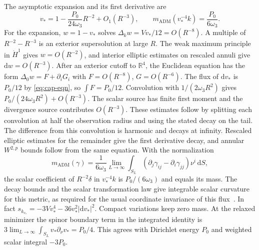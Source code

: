 \documentclass[11pt]{article}
\numberwithin{equation}{section}
\newcommand{\dd}{\mathrm{d}}
\newcommand{\RR}{\mathbb{R}}
\newcommand{\abs}[1]{\lvert #1\rvert}
\begin{document}
The asymptotic expansion and its first derivative are
\begin{equation}\label{eq:cap-mass}
 v_*=1-\frac{P_0}{24\omega_3}R^{-2}+O_1(R^{-3}),\qquad
 m_{\mathrm{ADM}}(v_*^{-4}k)=\frac{P_0}{6\omega_3}.
\end{equation}
For the expansion, \(w=1-v_*\) solves
\(\Delta_k w=Vv_*/12=O(R^{-8})\). A multiple of \(R^{-2}-R^{-3}\)
is an exterior supersolution at large \(R\). The weak maximum
principle in \(\dot H^1\) gives \(w=O(R^{-2})\), and interior
elliptic estimates on rescaled annuli give \(\dd w=O(R^{-3})\).
After an exterior cutoff to \(\RR^4\), the Euclidean equation has
the form \(\Delta_0 w=F+\partial_i G_i\) with
\(F=O(R^{-8})\), \(G=O(R^{-6})\). The flux of
\(\dd v_*\) is \(P_0/12\) by \eqref{eq:cap-eqn}, so
\(\int F=P_0/12\). Convolution with \(1/(2\omega_3 R^2)\)
gives \(P_0/(24\omega_3 R^2)+O(R^{-3})\). The scalar source has
finite first moment and the divergence source contributes
\(O(R^{-3})\). These estimates follow by splitting each convolution
at half the observation radius and using the stated decay on the
tail. The difference from this convolution is harmonic and decays
at infinity. Rescaled elliptic estimates for the remainder give
the first derivative decay, and annular \(W^{2,p}\) bounds follow
from the same equation. With the normalization
\[
 m_{\mathrm{ADM}}(\gamma)
 =\frac{1}{6\omega_3}\lim_{L\to\infty}
 \int_{S_L}(\partial_j\gamma_{ij}-\partial_i\gamma_{jj})
              \nu^i\,\dd S ,
\]
the scalar coefficient of \(R^{-2}\delta\) in \(v_*^{-4}k\)
is \(P_0/(6\omega_3)\) and equals its mass. The decay bounds and
the scalar transformation law give integrable scalar curvature
for this metric, as required for the usual coordinate invariance
of this flux~\cite[\S4]{Bartnik1986Mass}. In fact
\(s_{k_{v_*}}=-3Vv_*^4-36v_*^2\abs{\dd v_*}^2\).
Compact variations keep zero mass. At the relaxed minimizer the
spinor boundary term in the integrated identity is
\(3\lim_{L\to\infty}\int_{S_L}v_*\partial_\nu v_*=P_0/4\).
This agrees with Dirichlet energy \(P_0\) and weighted scalar
integral \(-3P_0\).
\end{document}
